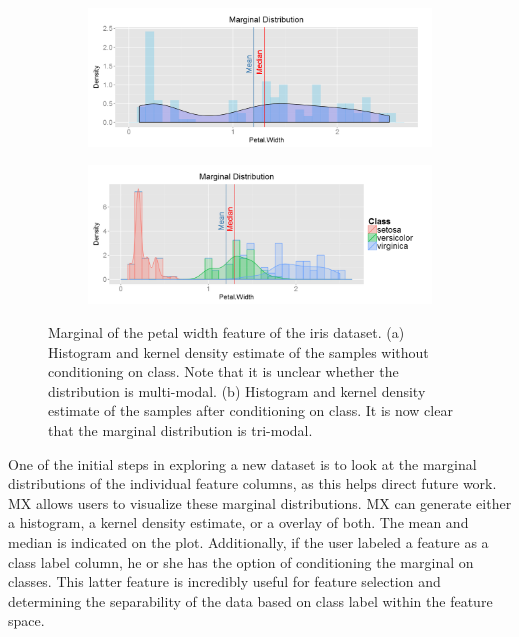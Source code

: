 \documentclass[twoside,leqno,twocolumn]{article}
\begin{document}
\begin{figure}[t!]
	\centering
	\begin{subfigure}[t]{0.48\textwidth}
		\includegraphics[width=\textwidth,valign=t]{Figures/Iris/MarginalPetalWidthnocond.png}
		\subcaption{}
		\label{fig:FigMarginalNoCond}
	\end{subfigure}
	\begin{subfigure}[t]{0.48\textwidth}
		\includegraphics[width=\textwidth,valign=t]{Figures/Iris/MarginalPetalWidth.png}
		\subcaption{}
		\label{fig:FigMarginal}
	\end{subfigure}
	\caption{Marginal of the petal width feature of the iris dataset. (a) Histogram and kernel density estimate of the samples without conditioning on class. Note that it is unclear whether the distribution is multi-modal. (b) Histogram and kernel density estimate of the samples after conditioning on class. It is now clear that the marginal distribution is tri-modal.}
	\label{fig:FigSample}
\end{figure}

One of the initial steps in exploring a new dataset is to look at the marginal distributions of the individual feature columns, as this helps direct future work. MX allows users to visualize these marginal distributions. MX can generate either a histogram, a kernel density estimate, or a overlay of both. The mean and median is indicated on the plot. Additionally, if the user labeled a feature as a class label column, he or she has the option of conditioning the marginal on classes. This latter feature is incredibly useful for feature selection and determining the separability of the data based on class label within the feature space.
\end{document}
